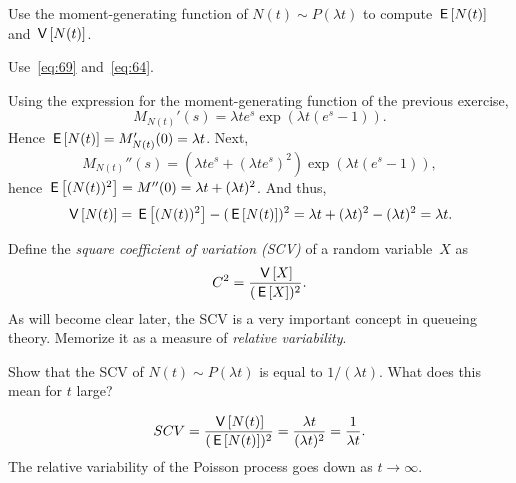 \begin{exercise}{\faCalculator}
Use  the moment-generating function of $N(t)\sim P(\lambda t)$ to compute $\,\mathsf{E}\left[N(t)\right]$ and $\,\mathsf{V}\left[N(t)\right]$. 
\begin{hint}
Use~\eqref{eq:69} and~\eqref{eq:64}. 
\end{hint}
\begin{solution}
Using the expression for the moment-generating function of the previous exercise,
  \begin{equation*}
    M_{N(t)}'(s) = \lambda t e^s \exp(\lambda t(e^s - 1)).
  \end{equation*}
Hence $\,\mathsf{E}\left[N(t)\right] = M_{N(t)}'(0) = \lambda t $. Next, 
  \begin{equation*}
    M_{N(t)}''(s) = (\lambda t e^s + (\lambda t e^s)^2) \exp(\lambda t(e^s - 1)),
  \end{equation*}
hence $\,\mathsf{E}\left[(N(t))^2\right] = M''(0) = \lambda t + (\lambda t)^2$. And thus, 
\begin{equation*}
\,\mathsf{V}\left[N(t)\right] =\,\mathsf{E}\left[(N(t))^2\right]-(\,\mathsf{E}\left[N(t)\right])^2 = \lambda t + (\lambda t)^2 - (\lambda t)^2 = \lambda t.
\end{equation*}
\end{solution}
\end{exercise}

Define the \emph{square coefficient  of variation (SCV)} of a random variable~$X$ as 
\begin{equation}\label{eq:62}
  C^2= \frac{\,\mathsf{V}\left[X\right]}{(\,\mathsf{E}\left[X\right])^2}.
\end{equation}
As  will become clear later, the SCV is a very important concept in
  queueing theory. Memorize it as a measure of \emph{relative
  variability}.

\begin{exercise}{\faFlask}
Show that   the SCV of $N(t)\sim P(\lambda t)$ is equal to $1/(\lambda t)$.  What does this mean for $t$ large?
  \begin{solution}
    \begin{equation*}
SCV = \frac{\,\mathsf{V}\left[N(t)\right]}{(\,\mathsf{E}\left[N(t)\right])^2} = \frac{\lambda t}{(\lambda t)^2} = \frac1{\lambda t}.
    \end{equation*}
The relative variability of the Poisson process goes down as $t\to\infty$.  
  \end{solution}
\end{exercise}


